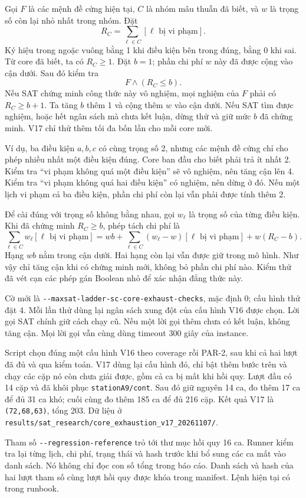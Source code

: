 \documentclass[11pt,a4paper]{article}
\newcommand{\code}[1]{\texttt{#1}}
\newcommand{\file}[1]{\nolinkurl{#1}}
\begin{document}
Gọi $F$ là các mệnh đề cứng hiện tại, $C$ là nhóm mâu thuẫn đã biết, và
$w$ là trọng số còn lại nhỏ nhất trong nhóm. Đặt
\[
 R_C=\sum_{\ell\in C}[\ell\text{ bị vi phạm}].
\]
Ký hiệu trong ngoặc vuông bằng 1 khi điều kiện bên trong đúng, bằng 0
khi sai. Từ core đã biết, ta có $R_C\geq1$. Đặt $b=1$; phần chi phí
$w$ này đã được cộng vào cận dưới. Sau đó kiểm tra
\[
 F\land(R_C\leq b).
\]
Nếu SAT chứng minh công thức này vô nghiệm, mọi nghiệm của $F$ phải có
$R_C\geq b+1$. Ta tăng $b$ thêm 1 và cộng thêm $w$ vào cận dưới. Nếu SAT
tìm được nghiệm, hoặc hết ngân sách mà chưa kết luận, dừng thử và giữ
mức $b$ đã chứng minh. V17 chỉ thử thêm tối đa bốn lần cho mỗi core mới.

Ví dụ, ba điều kiện $a,b,c$ có cùng trọng số 2, nhưng các mệnh đề cứng
chỉ cho phép nhiều nhất một điều kiện đúng. Core ban đầu cho biết phải
trả ít nhất 2. Kiểm tra ``vi phạm không quá một điều kiện'' sẽ vô nghiệm,
nên tăng cận lên 4. Kiểm tra ``vi phạm không quá hai điều kiện'' có nghiệm,
nên dừng ở đó. Nếu một lịch vi phạm cả ba điều kiện, phần chi phí còn lại
vẫn phải được tính thêm 2.

Để cài đúng với trọng số không bằng nhau, gọi $w_\ell$ là trọng số của
từng điều kiện. Khi đã chứng minh $R_C\geq b$, phép tách chi phí là
\[
 \sum_{\ell\in C}w_\ell[\ell\text{ bị vi phạm}]
 =wb+\sum_{\ell\in C}(w_\ell-w)[\ell\text{ bị vi phạm}]
   +w(R_C-b).
\]
Hạng $wb$ nằm trong cận dưới. Hai hạng còn lại vẫn được giữ trong mô hình.
Như vậy chỉ tăng cận khi có chứng minh mới, không bỏ phần chi phí nào.
Kiểm thử đã vét cạn các phép gán Boolean nhỏ để xác nhận đẳng thức này.

Cờ mới là \file{--maxsat-ladder-sc-core-exhaust-checks}, mặc định 0;
cấu hình thử đặt 4. Mỗi lần thử dùng lại ngân sách xung đột của cấu hình
V16 được chọn. Lời gọi SAT chính giữ cách chạy cũ. Nếu một lời gọi thêm
chưa có kết luận, không tăng cận. Mọi lời gọi vẫn cùng dùng timeout
300 giây của instance.

Script chọn đúng một cấu hình V16 theo coverage rồi PAR-2, sau khi cả hai
lượt đã đủ và qua kiểm toán. V17 dùng lại cấu hình đó, chỉ bật thêm bước
trên và chạy các cặp nó còn chưa giải được, gồm cả ca bị mất khi hồi quy.
Lượt đầu có 14 cặp và đã khôi phục \code{stationA9/cont}. Sau đó giữ
nguyên 14 ca, đo thêm 17 ca để đủ 31 ca khó; cuối cùng đo thêm 185 ca để
đủ 216 cặp. Kết quả V17 là \code{(72,68,63)}, tổng 203. Dữ liệu ở
\file{results/sat_research/core_exhaustion_v17_20261107/}.

Tham số \file{--regression-reference} trỏ tới thư mục hồi quy 16 ca. Runner
kiểm tra lại từng lịch, chi phí, trạng thái và hash trước khi bổ sung các
ca mất vào danh sách. Nó không chỉ đọc con số tổng trong báo cáo. Danh
sách và hash của hai lượt tham số cùng lượt hồi quy được khóa trong
manifest. Lệnh hiện tại có trong runbook.
\end{document}
